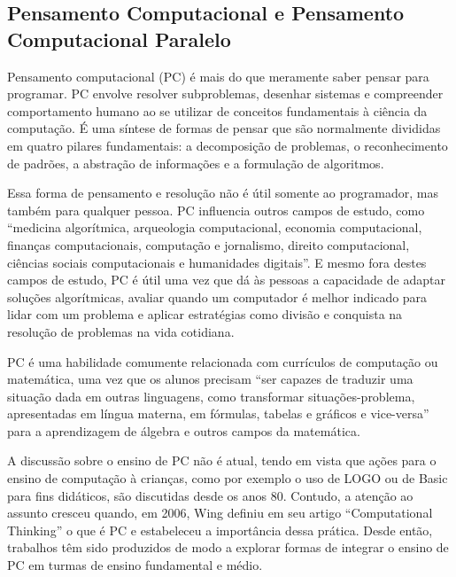 \documentclass[conference]{IEEEtran}
\newcommand{\xexeo}[1]{\ednote{\textcolor{red}{Xexéo - #1}}}
\newcommand{\horacio}[1]{\ednote{\textcolor{navy}{Horácio - #1}}}
\begin{document}
\subsection{Pensamento Computacional e Pensamento Computacional Paralelo}

Pensamento computacional (PC) é mais do que meramente saber pensar para programar. PC envolve resolver subproblemas, desenhar sistemas e compreender comportamento humano ao se utilizar de conceitos fundamentais à ciência da computação\cite{b2}. É uma síntese de formas de pensar que são normalmente divididas em quatro pilares fundamentais: a decomposição de problemas, o reconhecimento de padrões, a abstração de informações e a formulação de algoritmos\cite{b6}.

 Essa forma de pensamento e resolução não é útil somente ao programador, mas também para qualquer pessoa. PC influencia outros campos de estudo, como ``medicina algorítmica, arqueologia computacional, economia computacional, finanças computacionais, computação e jornalismo, direito computacional, ciências sociais computacionais e humanidades digitais\cite{b7}''. E mesmo fora destes campos de estudo, PC é útil uma vez que dá às pessoas a capacidade de adaptar soluções algorítmicas, avaliar quando um computador é melhor indicado para lidar com um problema e aplicar estratégias como divisão e conquista\xexeo{acho que me português é ``dividir para conquistar'', verificar em um livro de algoritmos?} \horacio{encontrei escrito das duas formas} na resolução de problemas na vida cotidiana\cite{b7}.

PC é uma habilidade comumente relacionada com currículos de computação\cite{b8} ou matemática, uma vez que os alunos precisam ``ser capazes de traduzir uma situação dada em outras linguagens, como transformar situações-problema, apresentadas em língua materna, em fórmulas, tabelas e gráficos e vice-versa''\cite{b4} para a aprendizagem de álgebra e outros campos da matemática. 

A discussão sobre o ensino de PC não é atual, tendo em vista que ações para o ensino de computação à crianças\xexeo{que medidas, para que, acho melhor falar ``algumas ações para ensinar computação para crianças'' }, como por exemplo o uso de LOGO ou de Basic para fins didáticos, são discutidas desde os anos 80\cite{b9}. Contudo, a atenção ao assunto cresceu quando, em 2006, Wing definiu em seu artigo ``Computational Thinking'' o que é PC e estabeleceu a importância dessa prática. Desde então, trabalhos têm sido produzidos de modo a explorar formas de integrar o ensino de PC em turmas de ensino fundamental e médio\cite{b1}\cite{b10}\cite{b11}\cite{b12}.
\end{document}

